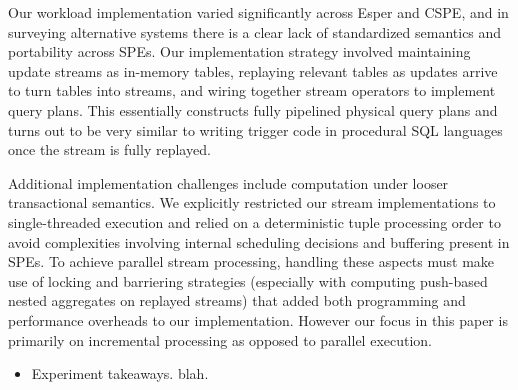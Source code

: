 Our workload implementation varied significantly across Esper and CSPE, and in
surveying alternative systems there is a clear lack of standardized semantics
and portability across SPEs. Our implementation strategy involved maintaining
update streams as in-memory tables, replaying relevant tables as updates arrive
to turn tables into streams, and wiring together stream operators to implement
query plans. This essentially constructs fully pipelined physical query
plans and turns out to be very similar to writing trigger code in procedural SQL
languages once the stream is fully replayed.

Additional implementation challenges include computation under looser
transactional semantics. We explicitly restricted our stream implementations to
single-threaded execution and relied on a deterministic tuple processing order
to avoid complexities involving internal scheduling decisions and buffering
present in SPEs. To achieve parallel stream processing, handling these aspects
must make use of locking and barriering strategies (especially with computing
push-based nested aggregates on replayed streams) that added both programming
and performance overheads to our implementation. However our focus in this paper
is primarily on incremental processing as opposed to parallel execution.

\begin{itemize}
  \item Experiment takeaways. blah.
\end{itemize}

